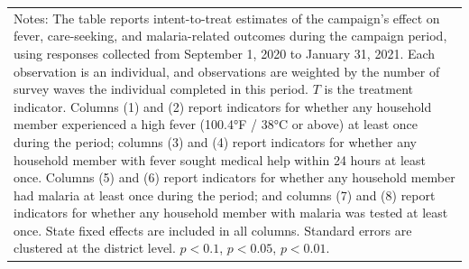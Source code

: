 {{\begin{tabular}{l*{8}{c}}
\hline\hline
\multicolumn{9}{p{.9\linewidth}}{\scriptsize  Notes: The table reports intent-to-treat estimates of the campaign’s effect on fever, care-seeking, and malaria-related outcomes during the campaign period, using responses collected from September 1, 2020 to January 31, 2021. Each observation is an individual, and observations are weighted by the number of survey waves the individual completed in this period. \(T\) is the treatment indicator. Columns (1) and (2) report indicators for whether any household member experienced a high fever (100.4°F / 38°C or above) at least once during the period; columns (3) and (4) report indicators for whether any household member with fever sought medical help within 24 hours at least once. Columns (5) and (6) report indicators for whether any household member had malaria at least once during the period; and columns (7) and (8) report indicators for whether any household member with malaria was tested at least once.  State fixed effects are included in all columns.  Standard errors are clustered at the district level. \sym{*} \(p<0.1\), \sym{**} \(p<0.05\), \sym{***} \(p<0.01\).}\\
\end{tabular}
}%

}
